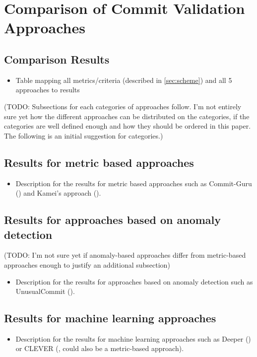 \section{Comparison of Commit Validation Approaches}

\subsection{Comparison Results}
\begin{itemize}
	\item Table mapping all metrics/criteria (described in \ref{sec:scheme}) and all 5 approaches to results
\end{itemize}

(TODO: Subsections for each categories of approaches follow. I'm not entirely sure yet how the different approaches can be distributed on the categories, if the categories are well defined enough and how they should be ordered in this paper. The following is an initial suggestion for categories.)
\subsection{Results for metric based approaches}
\begin{itemize}
	\item Description for the results for metric based approaches such as Commit-Guru (\cite{Nayrolles2018}) and Kamei's approach (\cite{Kamei2013}).
\end{itemize}
\subsection{Results for approaches based on anomaly detection}
(TODO: I'm not sure yet if anomaly-based approaches differ from metric-based approaches enough to justify an additional subsection)
\begin{itemize}
\item Description for the results for approaches based on anomaly detection such as UnusualCommit (\cite{Goyal2017}).
\end{itemize}
\subsection{Results for machine learning approaches}
\begin{itemize}
\item Description for the results for machine learning approaches such as Deeper (\cite{Yang2015}) or CLEVER (\cite{Nayrolles2018}, could also be a metric-based approach).
\end{itemize}



